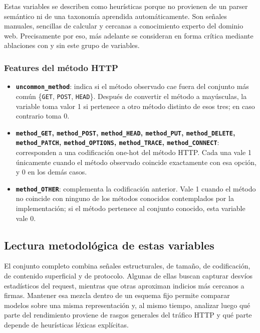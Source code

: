 \documentclass[12pt,oneside]{report}
\begin{document}
Estas variables se describen como heurísticas porque no provienen de un parser semántico ni de una taxonomía aprendida automáticamente. Son señales manuales, sencillas de calcular y cercanas a conocimiento experto del dominio web. Precisamente por eso, más adelante se consideran en forma crítica mediante ablaciones con y sin este grupo de variables.

\subsubsection{Features del método HTTP}
\begin{itemize}[leftmargin=*]
  \item \textbf{\texttt{uncommon\_method}}: indica si el método observado cae fuera del conjunto más común \{\texttt{GET}, \texttt{POST}, \texttt{HEAD}\}. Después de convertir el método a mayúsculas, la variable toma valor 1 si pertenece a otro método distinto de esos tres; en caso contrario toma 0.

  \item \textbf{\texttt{method\_GET}, \texttt{method\_POST}, \texttt{method\_HEAD}, \texttt{method\_PUT}, \texttt{method\_DELETE}, \texttt{method\_PATCH}, \texttt{method\_OPTIONS}, \texttt{method\_TRACE}, \texttt{method\_CONNECT}}: corresponden a una codificación one-hot del método HTTP. Cada una vale 1 únicamente cuando el método observado coincide exactamente con esa opción, y 0 en los demás casos.

  \item \textbf{\texttt{method\_OTHER}}: complementa la codificación anterior. Vale 1 cuando el método no coincide con ninguno de los métodos conocidos contemplados por la implementación; si el método pertenece al conjunto conocido, esta variable vale 0.
\end{itemize}

\subsection{Lectura metodológica de estas variables}
El conjunto completo combina señales estructurales, de tamaño, de codificación, de contenido superficial y de protocolo. Algunas de ellas buscan capturar desvíos estadísticos del request, mientras que otras aproximan indicios más cercanos a firmas. Mantener esa mezcla dentro de un esquema fijo permite comparar modelos sobre una misma representación y, al mismo tiempo, analizar luego qué parte del rendimiento proviene de rasgos generales del tráfico HTTP y qué parte depende de heurísticas léxicas explícitas.
\end{document}
